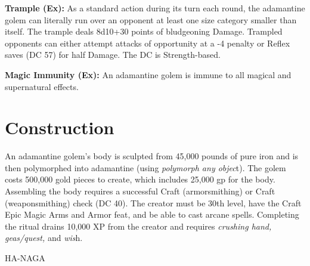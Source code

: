 \documentclass{article}
\begin{document}
{\textbf{Trample (Ex):} As a standard action during its turn each round, the adamantine 
golem can literally run over an opponent at least one size category smaller than 
itself. The trample deals 8d10+30 points of bludgeoning Damage. Trampled opponents 
can either attempt attacks of opportunity at a -4 penalty or Reflex saves (DC 57) 
for half Damage. The DC is Strength-based.

\textbf{Magic Immunity (Ex):} An adamantine golem is immune to all magical and 
supernatural effects.

\section*{Construction }

An adamantine golem's body is sculpted from 45,000 pounds of pure iron and is then 
polymorphed into adamantine (using \textit{polymorph any objec}t). The golem costs 
500,000 gold pieces to create, which includes 25,000 gp for the body. Assembling 
the body requires a successful Craft (armorsmithing) or Craft (weaponsmithing) 
check (DC 40). The creator must be 30th level, have the Craft Epic Magic Arms and 
Armor feat, and be able to cast arcane spells. Completing the ritual drains 10,000 
XP from the creator and requires \textit{crushing hand, geas/quest, }and \textit{wis}h. 

\vspace{12pt}
{\LARGE{}HA-NAGA }

}
\end{document}
